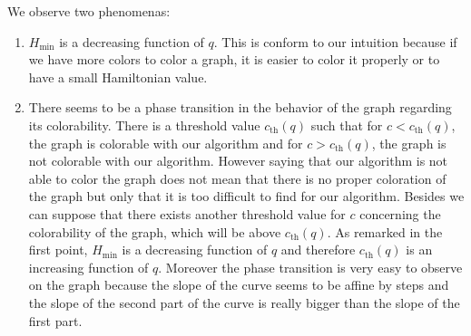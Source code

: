 \documentclass[a4paper]{article}
\begin{document}
We observe two phenomenas:
\begin{enumerate}
\item $H_{\min}$ is a decreasing function of $q$. This is conform to our intuition because if we have more colors to color a graph, it is easier to color it properly or to have a small Hamiltonian value.
\item There seems to be a phase transition in the behavior of the graph regarding its colorability. There is a threshold value $c_{\mathrm{th}}(q)$ such that for $c<c_{\mathrm{th}}(q)$, the graph is colorable with our algorithm and for $c>c_{\mathrm{th}}(q)$, the graph is not colorable with our algorithm. However saying that our algorithm is not able to color the graph does not mean that there is no proper coloration of the graph but only that it is too difficult to find for our algorithm. Besides we can suppose that there exists another threshold value for $c$ concerning the colorability of the graph, which will be above $c_{\mathrm{th}}(q)$. As remarked in the first point, $H_{\min}$ is a decreasing function of $q$ and therefore $c_{\mathrm{th}}(q)$ is an increasing function of $q$. Moreover the phase transition is very easy to observe on the graph because the slope of the curve seems to be affine by steps and the slope of the second part of the curve is really bigger than the slope of the first part.
\end{enumerate}



\end{document}

